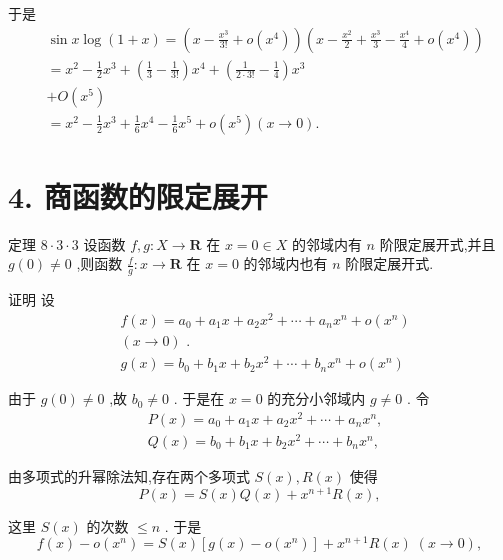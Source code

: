于是
\begin{align*}
	&\sin x\log \left( {1 + x}\right)  = \left( {x - \frac{{x}^{3}}{3!} + o\left( {x}^{4}\right) }\right) \left( {x - \frac{{x}^{2}}{2} + \frac{{x}^{3}}{3} - \frac{{x}^{4}}{4} + o\left( {x}^{4}\right) }\right)\\
	&= {x}^{2} - \frac{1}{2}{x}^{3} + \left( {\frac{1}{3} - \frac{1}{3!}}\right) {x}^{4} + \left( {\frac{1}{2 \cdot  3!} - \frac{1}{4}}\right) {x}^{3}\\
	&+ O\left( {x}^{5}\right)\\
	&= {x}^{2} - \frac{1}{2}{x}^{3} + \frac{1}{6}{x}^{4} - \frac{1}{6}{x}^{5} + o\left( {x}^{5}\right) \left( {x \rightarrow  0}\right) .
\end{align*}

\section*{4. 商函数的限定展开}

定理 $8 \cdot  3 \cdot  3$ 设函数 $f,g : X \rightarrow  \mathbf{R}$ 在 $x = 0 \in  X$ 的邻域内有 $n$ 阶限定展开式,并且 $g\left( 0\right)  \neq  0$ ,则函数 $\frac{f}{g} : x \rightarrow  \mathbf{R}$ 在 $x = 0$ 的邻域内也有 $n$ 阶限定展开式.

证明 设
\begin{align*}
	&f\left( x\right)  = {a}_{0} + {a}_{1}x + {a}_{2}{x}^{2} + \cdots  + {a}_{n}{x}^{n} + o\left( {x}^{n}\right)\\
	&\left( {x \rightarrow  0}\right) \text{ . }\\
	&g\left( x\right)  = {b}_{0} + {b}_{1}x + {b}_{2}{x}^{2} + \cdots  + {b}_{n}{x}^{n} + o\left( {x}^{n}\right)
\end{align*}

由于 $g\left( 0\right)  \neq  0$ ,故 ${b}_{0} \neq  0$ . 于是在 $x = 0$ 的充分小邻域内 $g \neq  0$ . 令
\begin{align*}
	&P\left( x\right)  = {a}_{0} + {a}_{1}x + {a}_{2}{x}^{2} + \cdots  + {a}_{n}{x}^{n},\\
	&Q\left( x\right)  = {b}_{0} + {b}_{1}x + {b}_{2}{x}^{2} + \cdots  + {b}_{n}{x}^{n},
\end{align*}

由多项式的升幂除法知,存在两个多项式 $S\left( x\right) ,R\left( x\right)$ 使得
$$P\left( x\right)  = S\left( x\right) Q\left( x\right)  + {x}^{n + 1}R\left( x\right) ,$$

这里 $S\left( x\right)$ 的次数 $\leq  n$ . 于是
$$f\left( x\right)  - o\left( {x}^{n}\right)  = S\left( x\right) \left\lbrack  {g\left( x\right)  - o\left( {x}^{n}\right) }\right\rbrack   + {x}^{n + 1}R\left( x\right) \;\left( {x \rightarrow  0}\right) ,$$

